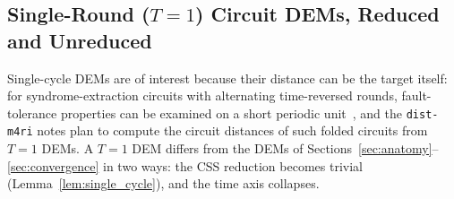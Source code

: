 \documentclass[12pt]{article}
\theoremstyle{definition}
\newcommand{\ttt}[1]{\texttt{#1}}
\begin{document}
\subsection{Single-Round (\texorpdfstring{$T = 1$}{T = 1}) Circuit DEMs, Reduced and Unreduced}\label{subsec:t1}

Single-cycle DEMs are of interest because their distance can be the target itself: for syndrome-extraction circuits
with alternating time-reversed rounds, fault-tolerance properties can be examined on a short periodic
unit~\cite{ShawTerhal2026Morphing}, and the \ttt{dist-m4ri} notes plan to compute the circuit distances of such folded
circuits from $T = 1$ DEMs. A $T = 1$ DEM differs from the DEMs of Sections~\ref{sec:anatomy}--\ref{sec:convergence}
in two ways: the CSS reduction becomes trivial (Lemma~\ref{lem:single_cycle}), and the time axis collapses.
\end{document}
